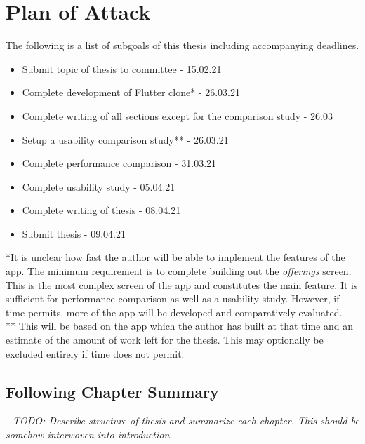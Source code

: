 \section{Plan of Attack}
\label{section:planofattack}
The following is a list of subgoals of this thesis including accompanying deadlines.

\begin{itemize}
    \item Submit topic of thesis to committee - 15.02.21
    \item Complete development of Flutter clone* - 26.03.21
    \item Complete writing of all sections except for the comparison study - 26.03
    \item Setup a usability comparison study** - 26.03.21
    \item Complete performance comparison - 31.03.21
    \item Complete usability study - 05.04.21
    \item Complete writing of thesis - 08.04.21
    \item Submit thesis - 09.04.21
    
\end{itemize}

*It is unclear how fast the author will be able to implement the features of the app. The minimum requirement is to complete building out the \textit{offerings} screen. This is the most complex screen of the app and constitutes the main feature. It is sufficient for performance comparison as well as a usability study. However, if time permits, more of the app will be developed and comparatively evaluated. \\

** This will be based on the app which the author has built at that time and an estimate of the amount of work left for the thesis. This may optionally be excluded entirely if time does not permit.

\subsection{Following Chapter Summary}
\textit{- TODO: Describe structure of thesis and summarize each chapter. 
This should be somehow interwoven into introduction.}